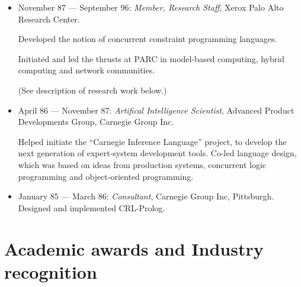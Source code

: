 \documentclass{article}
\begin{document}
\begin{itemize}
\item November 87 --- September 96: 
  \textit{Member, Research Staff}, Xerox Palo Alto Research Center.

  Developed the notion of concurrent constraint programming
  languages.
  
  Initiated and led the thrusts at PARC in model-based
  computing, hybrid computing and network communities.

  (See description of research work below.)

\item April 86 --- November 87: \textit{Artifical Intelligence
  Scientist}, Advanced Product Developments Group, Carnegie Group Inc.

  Helped initiate the ``Carnegie Inference Language'' project,
  to develop the next generation of expert-system development
  tools.  Co-led language design, which was based on ideas from
  production systems, concurrent logic programming and
  object-oriented programming.

\item January 85 --- March 86: \textit{Consultant}, Carnegie Group Inc, Pittsburgh.
 Designed and implemented CRL-Prolog.
\end{itemize}

\section*{Academic awards and Industry recognition}
\end{document}
